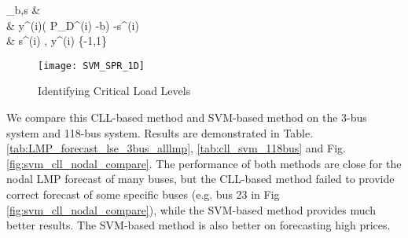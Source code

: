\documentclass[letterpaper, 11pt]{article}
\theoremstyle{plain}
\theoremstyle{definition}
\begin{document}
  \min_{b,s} &  \label{eqn:SVM2CLL_obj} \\ 
   & \qquad y^{(i)}( P_D^{(i)} -b) -s^{(i)} \label{eqn:SVM2CLL_cons} \\
  & \qquad  s^{(i)} , y^{(i)} \in \{-1,1\} \nonumber 


\begin{figure}[htbp]
  \centering
  \texttt{[image: SVM\_SPR\_1D]}
  \caption{Identifying Critical Load Levels}
  \label{fig:cll_ID}
\end{figure}

We compare this CLL-based method and SVM-based method on the 3-bus system and 118-bus system. Results are demonstrated in Table. \ref{tab:LMP_forecast_lse_3bus_alllmp}, \ref{tab:cll_svm_118bus} and Fig. \ref{fig:svm_cll_nodal_compare}. The performance of both methods are close for the nodal LMP forecast of many buses, 
but the CLL-based method failed to provide correct forecast of some specific buses (e.g. bus 23 in Fig \ref{fig:svm_cll_nodal_compare}), while the SVM-based method provides much better results. The SVM-based method is also better on forecasting high prices.
\end{document}
